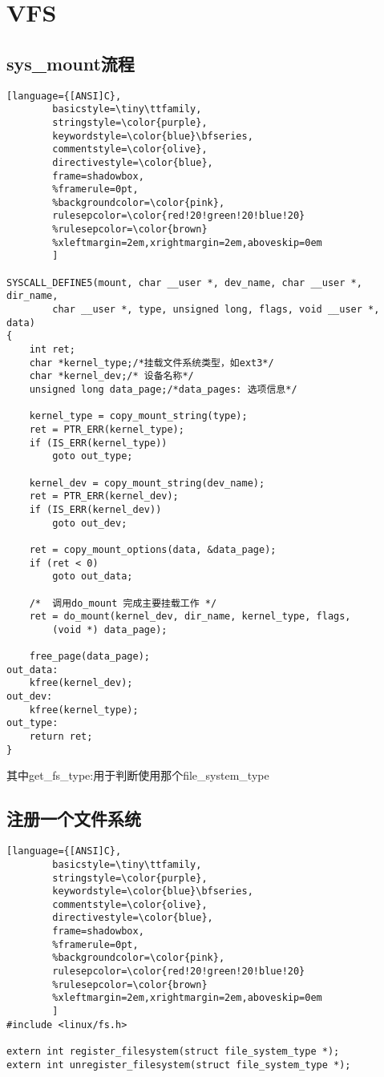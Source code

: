 \chapter{VFS}



\section{sys\_mount流程}


\begin{lstlisting}[language={[ANSI]C},
        basicstyle=\tiny\ttfamily,
        stringstyle=\color{purple},
        keywordstyle=\color{blue}\bfseries,
        commentstyle=\color{olive},
        directivestyle=\color{blue},
        frame=shadowbox,
        %framerule=0pt,
        %backgroundcolor=\color{pink},
        rulesepcolor=\color{red!20!green!20!blue!20}
        %rulesepcolor=\color{brown}
        %xleftmargin=2em,xrightmargin=2em,aboveskip=0em
        ]

SYSCALL_DEFINE5(mount, char __user *, dev_name, char __user *, dir_name,
		char __user *, type, unsigned long, flags, void __user *, data)
{
	int ret;
	char *kernel_type;/*挂载文件系统类型，如ext3*/
	char *kernel_dev;/* 设备名称*/
	unsigned long data_page;/*data_pages: 选项信息*/

	kernel_type = copy_mount_string(type);
	ret = PTR_ERR(kernel_type);
	if (IS_ERR(kernel_type))
		goto out_type;

	kernel_dev = copy_mount_string(dev_name);
	ret = PTR_ERR(kernel_dev);
	if (IS_ERR(kernel_dev))
		goto out_dev;

	ret = copy_mount_options(data, &data_page);
	if (ret < 0)
		goto out_data;
	
	/*  调用do_mount 完成主要挂载工作 */  
	ret = do_mount(kernel_dev, dir_name, kernel_type, flags,
		(void *) data_page);

	free_page(data_page);
out_data:
	kfree(kernel_dev);
out_dev:
	kfree(kernel_type);
out_type:
	return ret;
}
\end{lstlisting}

其中get\_fs\_type:用于判断使用那个file\_system\_type

\section{注册一个文件系统}
\begin{lstlisting}[language={[ANSI]C},
        basicstyle=\tiny\ttfamily,
        stringstyle=\color{purple},
        keywordstyle=\color{blue}\bfseries,
        commentstyle=\color{olive},
        directivestyle=\color{blue},
        frame=shadowbox,
        %framerule=0pt,
        %backgroundcolor=\color{pink},
        rulesepcolor=\color{red!20!green!20!blue!20}
        %rulesepcolor=\color{brown}
        %xleftmargin=2em,xrightmargin=2em,aboveskip=0em
        ]
#include <linux/fs.h>

extern int register_filesystem(struct file_system_type *);
extern int unregister_filesystem(struct file_system_type *);
\end{lstlisting}


